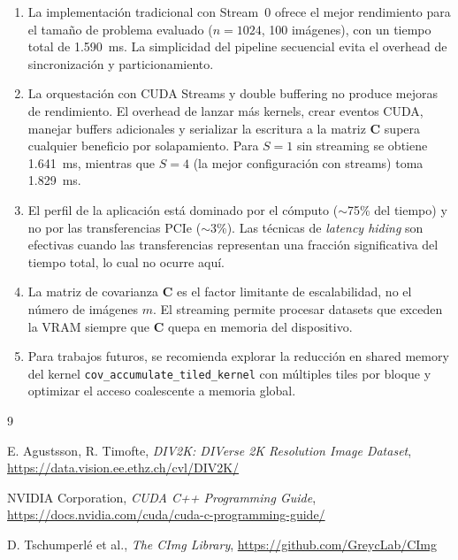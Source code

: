 \documentclass[12pt,a4paper]{article}
\begin{document}
\begin{enumerate}
    \item La implementación tradicional con Stream~0 ofrece el mejor rendimiento
          para el tama\~no de problema evaluado ($n=1024$, 100 imágenes), con un
          tiempo total de 1.590~ms. La simplicidad del pipeline secuencial evita
          el overhead de sincronización y particionamiento.

    \item La orquestación con CUDA Streams y double buffering no produce mejoras
          de rendimiento. El overhead de lanzar más kernels, crear eventos CUDA,
          manejar buffers adicionales y serializar la escritura a la matriz $\mathbf{C}$
          supera cualquier beneficio por solapamiento. Para $S=1$ sin streaming
          se obtiene 1.641~ms, mientras que $S=4$ (la mejor configuración con
          streams) toma 1.829~ms.

    \item El perfil de la aplicación está dominado por el cómputo ($\sim$75\% del
          tiempo) y no por las transferencias PCIe ($\sim$3\%). Las técnicas de
          \textit{latency hiding} son efectivas cuando las transferencias representan
          una fracción significativa del tiempo total, lo cual no ocurre aquí.

    \item La matriz de covarianza $\mathbf{C}$ es el factor limitante de
          escalabilidad, no el número de imágenes $m$. El streaming permite
          procesar datasets que exceden la VRAM siempre que $\mathbf{C}$ quepa
          en memoria del dispositivo.

    \item Para trabajos futuros, se recomienda explorar la reducción en shared
          memory del kernel \texttt{cov\_accumulate\_tiled\_kernel} con múltiples
          tiles por bloque y optimizar el acceso coalescente a memoria global.
\end{enumerate}


\begin{thebibliography}{9}

E. Agustsson, R. Timofte,
\textit{DIV2K: DIVerse 2K Resolution Image Dataset},
\url{https://data.vision.ee.ethz.ch/cvl/DIV2K/}

NVIDIA Corporation,
\textit{CUDA C++ Programming Guide},
\url{https://docs.nvidia.com/cuda/cuda-c-programming-guide/}

D. Tschumperlé et al.,
\textit{The CImg Library},
\url{https://github.com/GreycLab/CImg}

\end{thebibliography}
\end{document}
